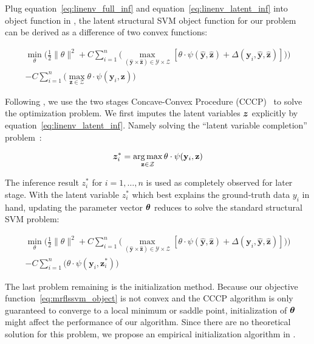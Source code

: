 Plug equation~\eqref{eq:linenv_full_inf} and
equation~\eqref{eq:linenv_latent_inf} into object function in
\cite{yu2009learning}, the latent structural SVM object function
for our problem can be derived as a difference of two convex
functions:

\begin{align}
\label{eq:lssvm_object}
  \min_\theta\bigg(\frac{1}{2}\|\theta\|^2+
  C\sum_{i=1}^{n}\big(\max_{(\mathbf{\hat{y}} \times
  \mathbf{\hat{z}}) \in \mathcal{Y} \times \mathcal{Z}}
  [\theta\cdot\psi(\mathbf{\hat{y}},\mathbf{\hat{z}}) +
  \Delta(\mathbf{y}_i,\mathbf{\hat{y}},\mathbf{\hat{z}})]\big)\bigg)\\
  -C\sum_{i=1}^{n}\big(\max_{\mathbf{z} \in \mathcal{Z}} \theta \cdot
  \psi(\mathbf{y}_i,\mathbf{z})\big)\nonumber
\end{align}

Following , we use the two stages
Concave-Convex Procedure (CCCP)~\cite{yuille2002concave} to solve
the optimization problem. We first imputes the latent variables
${\bm{z}}$ explicitly by equation~\eqref{eq:linenv_latent_inf}. Namely
solving the ``latent variable completion''
problem~\cite{yu2009learning}:

\begin{align}
  {\bm{z}}_i^*=\operatorname*{arg\,max}_{\mathbf{z} \in \mathcal{Z}} \theta \cdot
  \psi(\mathbf{y}_i,\mathbf{z})
\end{align}

The inference result $z_i^*$ for $i=1,\dots,n$ is used as
completely observed for later stage. With the latent variable
$z_i^*$ which best explains the ground-truth data $y_i$ in hand,
updating the parameter vector ${\bm{\theta}}$ reduces to solve the
standard structural SVM problem:

\begin{align}
\label{eq:mrflssvm_object}
  \min_\theta\bigg(\frac{1}{2}\|\theta\|^2+
  C\sum_{i=1}^{n}\big(\max_{(\mathbf{\hat{y}} \times
  \mathbf{\hat{z}}) \in \mathcal{Y} \times \mathcal{Z}}
  [\theta\cdot\psi(\mathbf{\hat{y}},\mathbf{\hat{z}}) +
  \Delta(\mathbf{y}_i,\mathbf{\hat{y}},\mathbf{\hat{z}})]\big)\bigg)\\
  -C\sum_{i=1}^{n}\big(\theta \cdot
  \psi(\mathbf{y}_i,\mathbf{z}_i^*)\big) \nonumber
\end{align}

The last problem remaining is the initialization method. Because
our objective function~\eqref{eq:mrflssvm_object} is not convex
and the CCCP algorithm is only guaranteed to converge to a local
minimum or saddle point\cite{yuille2002concave}, initialization
of ${\bm{\theta}}$ might affect the performance of our algorithm. Since
there are no theoretical solution for this problem, we propose an
empirical initialization algorithm in .


